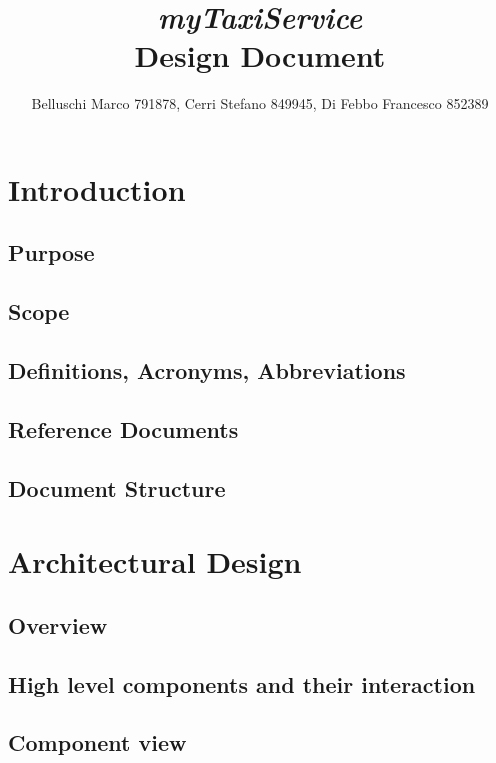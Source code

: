 \documentclass[]{report}
\title{{\Huge\textit{myTaxiService}}\\{\Large Design Document}}
\author{Belluschi Marco 791878, Cerri Stefano 849945, Di Febbo Francesco 852389}
\begin{document}
\maketitle
\tableofcontents

\chapter{Introduction}

\section{Purpose}


\section{Scope}


\section{Definitions, Acronyms, Abbreviations}


\section{Reference Documents}


\section{Document Structure}


\chapter{Architectural Design}

\section{Overview}


\section{High level components and their interaction}


\section{Component view}

\end{document}
